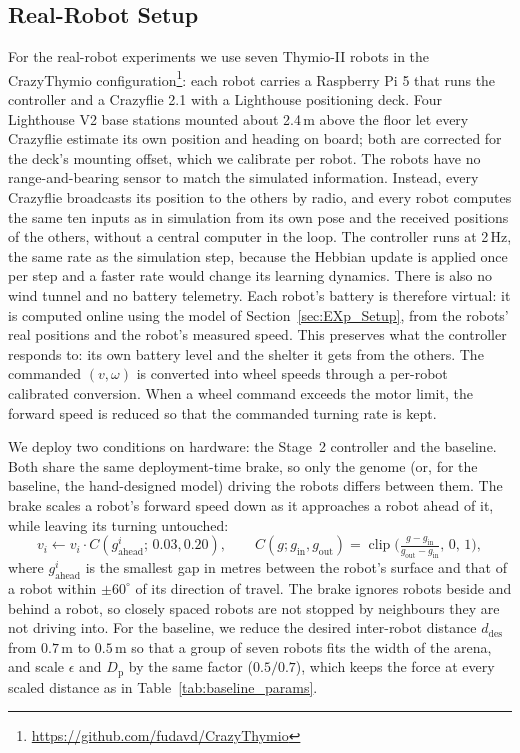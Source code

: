 \documentclass[runningheads]{llncs}
\begin{document}
\subsection{Real-Robot Setup}
\label{sec:hardware_setup}

For the real-robot experiments we use seven Thymio-II robots in the CrazyThymio configuration\footnote{\url{https://github.com/fudavd/CrazyThymio}}: each robot carries a Raspberry Pi 5 that runs the controller and a Crazyflie 2.1 with a Lighthouse positioning deck. Four Lighthouse V2 base stations mounted about 2.4\,m above the floor let every Crazyflie estimate its own position and heading on board; both are corrected for the deck's mounting offset, which we calibrate per robot. The robots have no range-and-bearing sensor to match the simulated information. Instead, every Crazyflie broadcasts its position to the others by radio, and every robot computes the same ten inputs as in simulation from its own pose and the received positions of the others, without a central computer in the loop. The controller runs at 2\,Hz, the same rate as the simulation step, because the Hebbian update is applied once per step and a faster rate would change its learning dynamics. There is also no wind tunnel and no battery telemetry. Each robot's battery is therefore virtual: it is computed online using the model of Section~\ref{sec:EXp_Setup}, from the robots' real positions and the robot's measured speed. This preserves what the controller responds to: its own battery level and the shelter it gets from the others. The commanded $(v, \omega)$ is converted into wheel speeds through a per-robot calibrated conversion. When a wheel command exceeds the motor limit, the forward speed is reduced so that the commanded turning rate is kept.

We deploy two conditions on hardware: the Stage~2 controller and the baseline. Both share the same deployment-time brake, so only the genome (or, for the baseline, the hand-designed model) driving the robots differs between them. The brake scales a robot's forward speed down as it approaches a robot ahead of it, while leaving its turning untouched:
\begin{equation}
v_i \leftarrow v_i \cdot C(g^i_{\text{ahead}};\,0.03, 0.20),
\qquad
C(g; g_{\text{in}}, g_{\text{out}}) = \operatorname{clip}\!\Big(\tfrac{g - g_{\text{in}}}{g_{\text{out}} - g_{\text{in}}},\,0,\,1\Big),
\label{eq:brake}
\end{equation}
where $g^i_{\text{ahead}}$ is the smallest gap in metres between the robot's surface and that of a robot within $\pm 60^\circ$ of its direction of travel. The brake ignores robots beside and behind a robot, so closely spaced robots are not stopped by neighbours they are not driving into. For the baseline, we reduce the desired inter-robot distance $d_{\text{des}}$ from $0.7$\,m to $0.5$\,m so that a group of seven robots fits the width of the arena, and scale $\epsilon$ and $D_{\text{p}}$ by the same factor ($0.5/0.7$), which keeps the force at every scaled distance as in Table~\ref{tab:baseline_params}.
\end{document}
